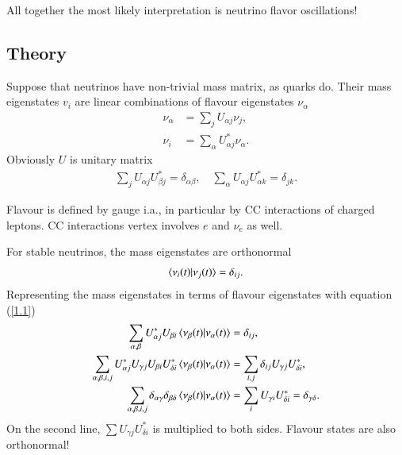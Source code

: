 All together the most likely interpretation is neutrino flavor oscillations!

\subsection{Theory}
Suppose that neutrinos have non-trivial mass matrix, as quarks do. Their mass eigenstates $v_i$ are linear combinations of flavour eigenstates $\nu_\alpha$
\begin{align}
   \nu_\alpha &= \sum_{j} U_{\alpha j} \nu_j, \label{1.1} \\
   \nu_i &= \sum_{\alpha} U^*_{\alpha j} \nu_\alpha.
\end{align}
Obviously $U$ is unitary matrix
\begin{align*}
   \sum_{j} U_{\alpha j} U^*_{\beta j} = \delta_{\alpha \beta}, \quad
   \sum_{\alpha} U_{\alpha j} U^*_{\alpha k} = \delta_{jk}.
\end{align*}

Flavour is defined by gauge i.a., in particular by CC interactions of charged leptons. CC interactions vertex involves $e$ and $\nu_e$ as well.

For stable neutrinos, the mass eigenstates are orthonormal
\begin{align}
   \braket{ \nu_i (t) | \nu_j (t)} = \delta_{ij}.
\end{align}
Representing the mass eigenstates in terms of flavour eigenstates with equation (\ref{1.1})
\begin{align}
   \sum_{\alpha, \beta} U^*_{\alpha j} U_{\beta i} \braket{\nu_\beta (t) | \nu_\alpha (t)} &= \delta_{ij}, \notag \\
   \sum_{\alpha, \beta, i, j} U^*_{\alpha j} U_{\gamma j} U_{\beta i} U^*_{\delta i} \braket{\nu_\beta (t ) | \nu_\alpha (t)} &= \sum_{i,j} \delta_{ij} U_{\gamma j} U^*_{\delta i}, \notag \\
   \sum_{\alpha, \beta, i, j} \delta_{\alpha \gamma} \delta_{\beta \delta} \braket{\nu_\beta(t) | \nu_\alpha(t)} &= \sum_{i} U_{\gamma i} U^*_{\delta i} = \delta_{\gamma \delta}. \label{1.3}
\end{align}
On the second line, $\sum U_{\gamma j} U^*_{\delta i}$ is multiplied to both sides. Flavour states are also orthonormal!

